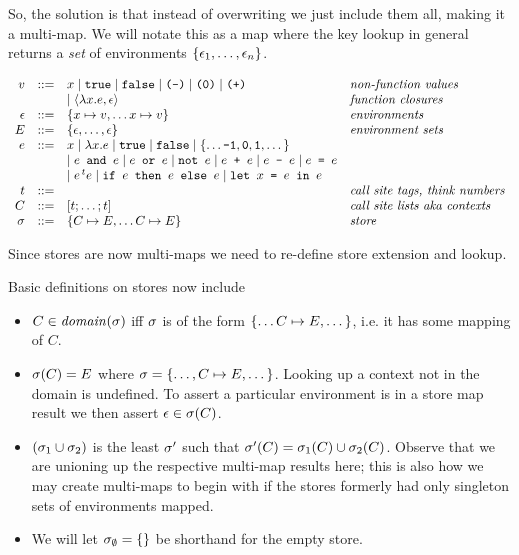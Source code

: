 So, the solution is that instead of overwriting we just include them all, making it a multi-map.  We will notate this as a map where the key lookup in general returns a \emph{set} of environments $\{\epsilon_1,\dots,\epsilon_n\}$.

$$
\begin{array}{rcll}
v &::=& x \mid \texttt{true} \mid \texttt{false} \mid \texttt{(-)}\mid \texttt{(0)}\mid \texttt{(+)}& \textit{non-function values}\\
  &   & \mid \langle \lambda x. e, \epsilon \rangle  & \textit{function closures}\\
\epsilon &::=& \{x \mapsto v, \dots x \mapsto v \}&\textit{environments}\\
E &::=& \{\epsilon, \dots,\epsilon \}&\textit{environment sets}\\
e &::=& x \mid \lambda x. e \mid \texttt{true} \mid \texttt{false} \mid \{\dots \texttt{-1}, \texttt{0}, \texttt{1}, \dots\}\\
  &   & \mid e \texttt{ and } e \mid e \texttt{ or } e \mid \texttt{not }
        e \mid e \texttt{ + }e \mid e \texttt{ - }e \mid e \texttt{ = }e \\
& & \mid e^{\,t}e
\mid \texttt{if }e\texttt{ then }e\texttt{ else }e
\mid \texttt{let } x \texttt{ = }e\texttt{ in }e\\
t &::=& & \textit{call site tags, think numbers}\\
C &::=& [t;\ldots;t] & \textit{call site lists aka contexts}\\
\sigma &::=& \{C \mapsto E, \dots C \mapsto E\} & \textit{store}
\end{array}
$$

Since stores are now multi-maps we need to re-define store extension and lookup.
\begin{definition}
  Basic definitions on stores now include
  \begin{itemize}
  \item $C \in \mathit{domain}(\sigma)$ iff $\sigma$ is of the form $\{\dots C \mapsto E, \dots\}$, i.e. it has some mapping of $C$.
  \item $\sigma(C) = E $ where $\sigma = \{\dots, C \mapsto  E,\dots\}$.  Looking up a context not in the domain is undefined.  To assert a particular environment is in a store map result we then assert $\epsilon \in \sigma(C)$.
  \item $(\sigma_1 \cup \sigma_2)$ is the least $\sigma'$ such that $\sigma'(C) = \sigma_1(C) \cup \sigma_2(C)$.  Observe that we are unioning up the respective multi-map results here; this is also how we may create multi-maps to begin with if the stores formerly had only singleton sets of environments mapped.
  \item We will let $\sigma_\emptyset = \{\}$ be shorthand for the empty store.
  \end{itemize}
\end{definition}

